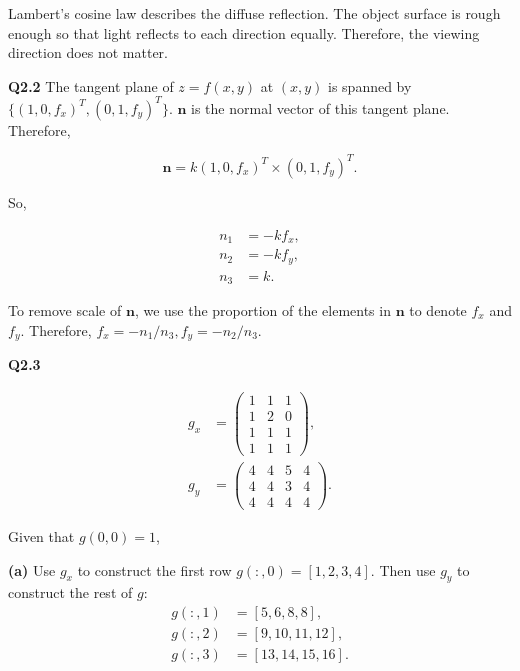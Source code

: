 \documentclass[
  course = {{16-720B Computer Vision}},
  quartile = {{1}},
  assignment = 5\ -\ 3D\ Reconstruction\ \&\ Photometric\ Stereo,
  name = {{Kangle Deng}},
  email = {{kangled@andrew.cmu.edu}},
  firstexercise = 1
]{aga-homework}
\begin{document}
Lambert's cosine law describes the diffuse reflection. The object surface is rough enough so that light reflects to each direction equally. Therefore, the viewing direction does not matter.

\noindent\textbf{Q2.2} The tangent plane of $z=f(x,y)$ at $(x,y)$ is spanned by $\{(1,0,f_x)^T, (0,1,f_y)^T\}$. $\mathbf{n}$ is the normal vector of this tangent plane. Therefore,

\begin{equation*}
    \mathbf{n} = k (1,0,f_x)^T \times (0,1,f_y)^T.
\end{equation*}

So,

\begin{equation*}
    \begin{aligned}
      n_1 & = -kf_x, \\
      n_2 & = -kf_y, \\
      n_3 & = k.
    \end{aligned}
\end{equation*}

To remove scale of $\mathbf{n}$, we use the proportion of the elements in $\mathbf{n}$ to denote $f_x$ and $f_y$. Therefore, $f_x = -n_1/n_3, f_y=-n_2/n_3$.

\noindent\textbf{Q2.3} 

\begin{equation*}
\begin{aligned}
      g_x & = \left(\begin{array}{ccc}
       1  & 1 & 1 \\
        1 & 2 & 0 \\
        1 & 1 & 1 \\
        1 & 1 & 1
    \end{array}
    \right), \\
    g_y & = \left(\begin{array}{cccc}
       4  & 4 & 5 & 4 \\
        4 & 4 & 3 & 4 \\
        4 & 4 & 4 & 4
    \end{array}\right).
\end{aligned}

\end{equation*}

Given that $g(0,0) = 1$,

\noindent\textbf{(a)} Use $g_x$ to construct the first row $g(:,0) = [1,2,3,4]$. Then use $g_y$ to construct the rest of $g$:
\begin{equation*}
    \begin{aligned}
          g(:,1) & = [5,6,8,8], \\
          g(:,2) & = [9,10,11,12], \\
          g(:,3) & = [13,14,15,16].
    \end{aligned}
\end{equation*}
\end{document}
